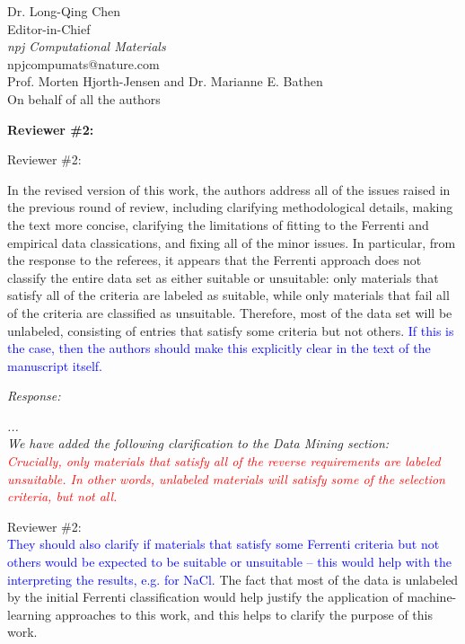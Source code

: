 \documentclass[11pt, a4paper]{letter} %
\begin{document}
\begin{letter}{
	Dr. Long-Qing Chen\\
	Editor-in-Chief\\
	\textit{npj Computational Materials} \\ 
	npjcompumats@nature.com \\ 
}
\noindent Prof. Morten Hjorth-Jensen and Dr. Marianne E. Bathen \\
On behalf of all the authors 






\end{letter}



\newpage 


\noindent
\textbf{Reviewer \#2: }

Reviewer \#2:

In the revised version of this work, the authors address all of the issues raised in the previous round of review, including clarifying methodological details, making the text more concise, clarifying the limitations of fitting to the Ferrenti and empirical data classications, and fixing all of the minor issues. In particular, from the response to the referees, it appears that the Ferrenti approach does not classify the entire data set as either suitable or unsuitable: only materials that satisfy all of the criteria are labeled as suitable, while only materials that fail all of the criteria are classified as unsuitable. Therefore, most of the data set will be unlabeled, consisting of entries that satisfy some criteria but not others. \textcolor{blue}{If this is the case, then the authors should make this explicitly clear in the text of the manuscript itself.}


\textit{Response:}  

\textit{... \\
We have added the following clarification to the Data Mining section: \\
\textcolor{red}{Crucially, only materials that satisfy \emph{all} of the reverse requirements are labeled unsuitable.
In other words, unlabeled materials will satisfy some of the selection criteria, but not all.}
} 


Reviewer \#2: \\
\textcolor{blue}{They should also clarify if materials that satisfy some Ferrenti criteria but not others would be expected to be suitable or unsuitable – this would help with the interpreting the results, e.g. for NaCl.} The fact that most of the data is unlabeled by the initial Ferrenti classification would help justify the application of machine-learning approaches to this work, and this helps to clarify the purpose of this work.
\end{document}
